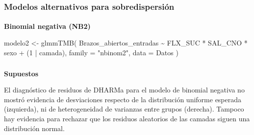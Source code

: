\documentclass[
  letterpaper,
  DIV=11,
  numbers=noendperiod]{scrartcl}
\makeatletter
\let\oldparagraph\paragraph
\renewcommand{\paragraph}{
    \@ifstar
      \xxxParagraphStar
      \xxxParagraphNoStar
  }
\newcommand{\xxxParagraphStar}[1]{\oldparagraph*{#1}\mbox{}}
\newcommand{\xxxParagraphNoStar}[1]{\oldparagraph{#1}\mbox{}}
\let\oldsubparagraph\subparagraph
\renewcommand{\subparagraph}{
    \@ifstar
      \xxxSubParagraphStar
      \xxxSubParagraphNoStar
  }
\newcommand{\xxxSubParagraphStar}[1]{\oldsubparagraph*{#1}\mbox{}}
\newcommand{\xxxSubParagraphNoStar}[1]{\oldsubparagraph{#1}\mbox{}}
\newenvironment{Shaded}{\begin{snugshade}}{\end{snugshade}}
\newcommand{\AttributeTok}[1]{\textcolor[rgb]{0.40,0.45,0.13}{#1}}
\newcommand{\DecValTok}[1]{\textcolor[rgb]{0.68,0.00,0.00}{#1}}
\newcommand{\FunctionTok}[1]{\textcolor[rgb]{0.28,0.35,0.67}{#1}}
\newcommand{\NormalTok}[1]{\textcolor[rgb]{0.00,0.23,0.31}{#1}}
\newcommand{\OtherTok}[1]{\textcolor[rgb]{0.00,0.23,0.31}{#1}}
\newcommand{\SpecialCharTok}[1]{\textcolor[rgb]{0.37,0.37,0.37}{#1}}
\newcommand{\StringTok}[1]{\textcolor[rgb]{0.13,0.47,0.30}{#1}}
\makeatother
\begin{document}
\subsubsection{\texorpdfstring{\textbf{Modelos alternativos para
sobredispersión}}{Modelos alternativos para sobredispersión}}\label{modelos-alternativos-para-sobredispersiuxf3n}

\paragraph{\texorpdfstring{\textbf{Binomial negativa
(NB2)}}{Binomial negativa (NB2)}}\label{binomial-negativa-nb2}

\begin{Shaded}
\begin{Highlighting}[]
\NormalTok{modelo2 }\OtherTok{\textless{}{-}} \FunctionTok{glmmTMB}\NormalTok{(}
\NormalTok{  Brazos\_abiertos\_entradas }\SpecialCharTok{\textasciitilde{}}\NormalTok{ FLX\_SUC }\SpecialCharTok{*}\NormalTok{ SAL\_CNO }\SpecialCharTok{*}\NormalTok{ sexo }\SpecialCharTok{+}\NormalTok{ (}\DecValTok{1} \SpecialCharTok{|}\NormalTok{ camada),}
  \AttributeTok{family =} \StringTok{"nbinom2"}\NormalTok{,}
  \AttributeTok{data =}\NormalTok{ Datos}
\NormalTok{)}
\end{Highlighting}
\end{Shaded}

\subparagraph{\texorpdfstring{\textbf{Supuestos}}{Supuestos}}\label{supuestos}

El diagnóstico de residuos de DHARMa para el modelo de binomial negativa
no mostró evidencia de desviaciones respecto de la distribución uniforme
esperada (izquierda), ni de heterogeneidad de varianzas entre grupos
(derecha). Tampoco hay evidencia para rechazar que los residuos
aleatorios de las camadas siguen una distribución normal.
\end{document}
